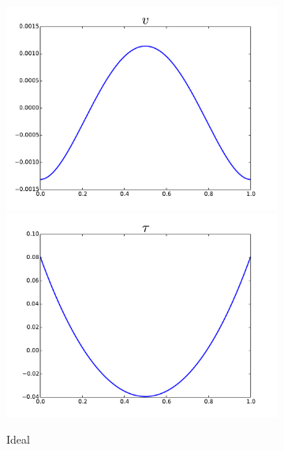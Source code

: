 \documentclass{article}
\theoremstyle{definition}
\theoremstyle{remark}
\begin{document}
\begin{figure}[ht]
\centering
\begin{subfigure}[t]{0.4\textwidth}
\centering
\includegraphics[width=\textwidth]{OptimalTestFunctions/uLinear_1e-2/steady/coupledrobust_steady_v}\\
\includegraphics[width=\textwidth]{OptimalTestFunctions/uLinear_1e-2/steady/coupledrobust_steady_tau}\\
\caption{Ideal}
\label{fig:idealCoupledRobust}
\end{subfigure}
\begin{subfigure}[t]{0.4\textwidth}
\centering

\end{subfigure}
\end{figure}
\end{document}
